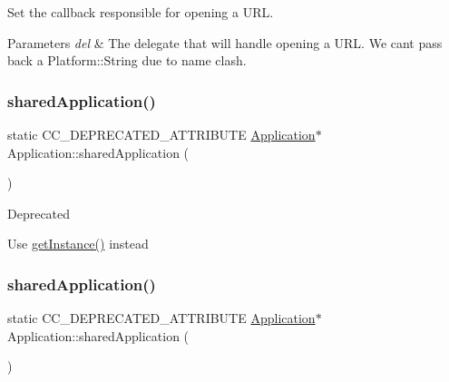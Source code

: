 Set the callback responsible for opening a U\+RL. 


\begin{DoxyParams}{Parameters}
{\em del} & The delegate that will handle opening a U\+RL. We can\textquotesingle{}t pass back a Platform\+::\+String due to name clash. \\
\hline
\end{DoxyParams}
\mbox{\label{classApplication_a13774a693274456e734b221cea01628c}} 
\subsubsection{\texorpdfstring{shared\+Application()}{sharedApplication()}\hspace{0.1cm}{\footnotesize\ttfamily [1/11]}}
{\footnotesize\ttfamily static C\+C\+\_\+\+D\+E\+P\+R\+E\+C\+A\+T\+E\+D\+\_\+\+A\+T\+T\+R\+I\+B\+U\+TE \hyperlink{classApplication}{Application}$\ast$ Application\+::shared\+Application (\begin{DoxyParamCaption}{ }\end{DoxyParamCaption})\hspace{0.3cm}{\ttfamily [static]}}

\begin{DoxyRefDesc}{Deprecated}
\item[\hyperlink{deprecated__deprecated000118}{Deprecated}]Use \hyperlink{classApplication_a723b8bba6edce3769a8d771770ca10e1}{get\+Instance()} instead \end{DoxyRefDesc}
\mbox{\label{classApplication_a13774a693274456e734b221cea01628c}} 
\subsubsection{\texorpdfstring{shared\+Application()}{sharedApplication()}\hspace{0.1cm}{\footnotesize\ttfamily [2/11]}}
{\footnotesize\ttfamily static C\+C\+\_\+\+D\+E\+P\+R\+E\+C\+A\+T\+E\+D\+\_\+\+A\+T\+T\+R\+I\+B\+U\+TE \hyperlink{classApplication}{Application}$\ast$ Application\+::shared\+Application (\begin{DoxyParamCaption}{ }\end{DoxyParamCaption})\hspace{0.3cm}{\ttfamily [static]}}

